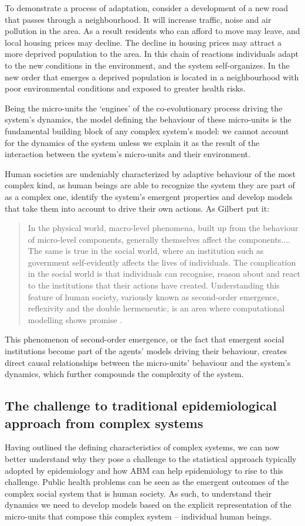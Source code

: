 \documentclass[review]{elsarticle}
\begin{document}
To demonstrate a process of adaptation, consider a development of a new road that passes through a neighbourhood. It will increase traffic, noise and air pollution in the area. As a result residents who can afford to move may leave, and local housing prices may decline. The decline in housing prices may attract a more deprived population to the area. In this chain of reactions individuals adapt to the new conditions in the environment, and the system self-organizes. In the new order that emerges a deprived population is located in a neighbourhood with poor environmental conditions and exposed to greater health risks.    

Being the micro-units the `engines' of the co-evolutionary process driving the system's dynamics, the model defining the behaviour of these micro-units is the fundamental building block of any complex system's model: we cannot account for the dynamics of the system unless we explain it as the result of the interaction between the system's micro-units and their environment.

Human societies are undeniably characterized by adaptive behaviour of the most complex kind, as human beings are able to recognize the system they are part of as a complex one, identify the system's emergent properties and develop models that take them into account to drive their own actions. As Gilbert put it:

\begin{quote}
In the physical world, macro-level phenomena, built up from the behaviour of micro-level components, generally themselves affect the components....
The same is true in the social world, where an institution such as government self-evidently affects the lives of individuals. The complication in the social world is that individuals can recognise, reason about and react to the institutions that their actions have created. Understanding this feature of human society, variously known as second-order emergence, reflexivity and the double hermeneutic, is an area where computational modelling shows promise \citep[][p. 5]{gilbert00}.
\end{quote}

This phenomenon of second-order emergence, or the fact that emergent social institutions become part of the agents' models driving their behaviour, creates direct causal relationships between the micro-units' behaviour and the system's dynamics, which further compounds the complexity of the system.

\subsection{The challenge to traditional epidemiological approach from complex systems}
Having outlined the defining characteristics of complex systems, we can now better understand why they pose a challenge to the statistical approach typically adopted by epidemiology and how ABM can help epidemiology to rise to this challenge. Public health problems can be seen as the emergent outcomes of the complex social system that is human society. As such, to understand their dynamics we need to develop models based on the explicit representation of the micro-units that compose this complex system -- individual human beings. 
\end{document}
